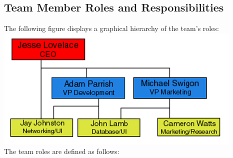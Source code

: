 \documentclass{report}
\begin{document}
\newpage

        \subsection{Team Member Roles and Responsibilities}
            The following figure displays a graphical hierarchy of the team's
            roles:\\

            \includegraphics{organization.png}
            \\The team roles are defined as follows:
\end{document}
